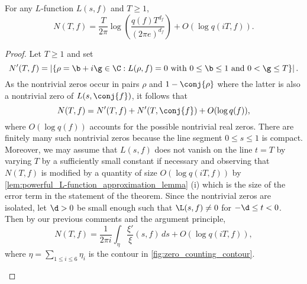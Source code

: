     \begin{theorem}\label{thm:zero_counting}
      For any $L$-function $L(s,f)$ and $T \ge 1$,
      \[
        N(T,f) = \frac{T}{2\pi}\log\left(\frac{q(f)T^{d_{f}}}{(2\pi e)^{d_{f}}}\right)+O(\log{q(iT,f)}).
      \]
    \end{theorem}
    \begin{proof}
      Let $T \ge 1$ and set
      \[
        N'(T,f) = \left|\{\rho = \b+i\g \in \C:L(\rho,f) = 0 \text{ with } 0 \le \b \le 1 \text{ and } 0 < \g \le T\}\right|.
      \]
      As the nontrivial zeros occur in pairs $\rho$ and $1-\conj{\rho}$ where the latter is also a nontrivial zero of $L(s,\conj{f})$, it follows that
      \[
        N(T,f) = N'(T,f)+N'(T,\conj{f})+O(\log{q(f)}),
      \]
      where $O(\log{q(f)})$ accounts for the possible nontrivial real zeros. There are finitely many such nontrivial zeros because the line segment $0 \le s \le 1$ is compact. Moreover, we may assume that $L(s,f)$ does not vanish on the line $t = T$ by varying $T$ by a sufficiently small constant if necessary and observing that $N(T,f)$ is modified by a quantity of size $O(\log{q}(iT,f))$ by \cref{lem:powerful_L-function_approximation_lemma} (i) which is the size of the error term in the statement of the theorem. Since the nontrivial zeros are isolated, let $\d > 0$ be small enough such that $\L(s,f) \neq 0$ for $-\d \le t < 0$. Then by our previous comments and the argument principle,
      \[
        N(T,f) = \frac{1}{2\pi i}\int_{\eta}\frac{\xi'}{\xi}(s,f)\,ds+O(\log{q}(iT,f)),
      \]
      where $\eta = \sum_{1 \le i \le 6}\eta_{i}$ is the contour in \cref{fig:zero_counting_contour}.

      \begin{figure}[ht]
        \centering
\end{figure}
\end{proof}
